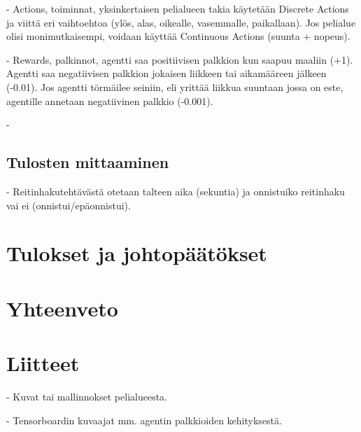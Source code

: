 \documentclass[utf8]{gradu3}
\begin{document}
- Actions, toiminnat, yksinkertaisen pelialueen takia käytetään Discrete Actions ja viittä eri vaihtoehtoa (ylös, alas, oikealle, vasemmalle, paikallaan). Jos pelialue olisi monimutkaisempi, voidaan käyttää Continuous Actions (suunta + nopeus).

- Rewards, palkinnot, agentti saa positiivisen palkkion kun saapuu maaliin (+1). Agentti saa negatiivisen palkkion jokaisen liikkeen tai aikamääreen jälkeen (-0.01). Jos agentti törmäilee seiniin, eli yrittää liikkua suuntaan jossa on este, agentille annetaan negatiivinen palkkio (-0.001).

- 

\section{Tulosten mittaaminen}
\label{sec:mittaaminen}

- Reitinhakutehtävästä otetaan talteen aika (sekuntia) ja onnistuiko reitinhaku vai ei (onnistui/epäonnistui).

\chapter{Tulokset ja johtopäätökset}

\chapter{Yhteenveto}

\printbibliography

\chapter{Liitteet}

- Kuvat tai mallinnokset pelialueesta.

- Tensorboardin kuvaajat mm. agentin palkkioiden kehityksestä.
\end{document}
